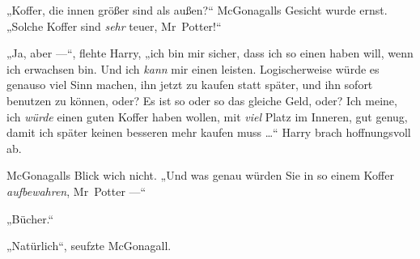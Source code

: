 „Koffer, die innen größer sind als außen?“
McGonagalls Gesicht wurde ernst.
„Solche Koffer sind \emph{sehr} teuer, Mr~Potter!“

„Ja, aber —“, flehte Harry, „ich bin mir sicher, dass ich so einen haben will, wenn ich erwachsen bin. Und ich \emph{kann} mir einen leisten. Logischerweise würde es genauso viel Sinn machen, ihn jetzt zu kaufen statt später, und ihn sofort benutzen zu können, oder? Es ist so oder so das gleiche Geld, oder? Ich meine, ich \emph{würde} einen guten Koffer haben wollen, mit \emph{viel} Platz im Inneren, gut genug, damit ich später keinen besseren mehr kaufen muss …“ Harry brach hoffnungsvoll ab.

McGonagalls Blick wich nicht.
„Und was genau würden Sie in so einem Koffer \emph{aufbewahren}, Mr~Potter —“

„Bücher.“

„Natürlich“, seufzte McGonagall.

